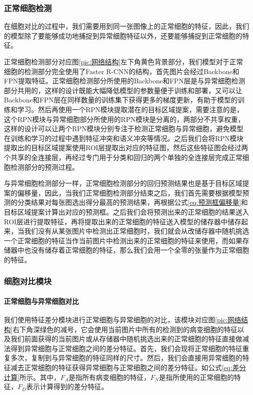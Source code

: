 \subsubsection{正常细胞检测}
\par 在细胞对比的过程中，我们需要用到同一张图像上的正常细胞的特征，因此，我们的模型除了要能够成功地捕捉到异常细胞特征以外，还要能够捕捉到正常细胞的特征。
\par 正常细胞检测部分对应图\ref{pic:网络结构}左下角黄色背景部分，我们模型对于正常细胞的检测部分完全使用了Faster R-CNN的结构，首先图片会经过Backbone和FPN提取特征。正常细胞检测部分所使用的Backbone和FPN层是与异常细胞检测部分共用的，这样的设计既能大幅降低模型的参数量便于训练和部署，又可以让Backbone和FPN层在同样数量的训练集下获得更多的梯度更新，有助于模型的训练和学习。然后再使用一个RPN模块提取潜在的目标区域提案，需要注意的是，这个RPN模块与异常细胞部分所使用的RPN模块是分离的，两部分不共享权重，这样的设计可以让两个RPN模块分别专注于检测正常细胞与异常细胞，避免模型在训练和学习的过程中遇到特征冲突和语义冲突等情况。之后我们会将RPN模块提取出的目标区域提案使用ROI层提取出对应的特征图，然后这些特征图会经过两个共享的全连接层，再经过专门用于分类和回归的两个单独的全连接层完成正常细胞检测部分的预测过程。
\par 与异常细胞检测部分一样，正常细胞检测部分的回归预测结果也是基于目标区域提案的偏移量，因此，当我们正常细胞检测部分结束之后，我们首先需要根据模型预测的分类结果对每张图选出得分最高的预测结果，再根据公式\ref{eq:预测框偏移量}和目标区域提案计算出对应的预测框。之后我们会将预测出来的正常细胞的结果送入ROI层进行提取特征，再将提取出来的正常细胞的特征送入模型的储存器中储存起来，当我们没有从某张图片中检测出正常细胞时，我们就会从改储存器中随机挑选一个正常细胞的特征当作当前图片中检测出来的正常细胞的特征来使用，而如果存储器中也没有储存着正常细胞的特征，那么我们会用一个全零的张量作为正常细胞的特征。

\subsubsection{细胞对比模块}
\paragraph{正常细胞与异常细胞对比}
\label{sec:正常细胞与异常细胞对比}
\par 我们使用特征差分模块进行正常细胞与异常细胞的对比，该模块对应图\ref{pic:网络结构}右下角深绿色的减号，它会使用当前图片中所有的检测到的病变细胞的特征以及我们前面获得的当前图片或从存储器中随机挑选出来的正常细胞的特征直接做减法得到异常细胞与正常细胞之间的差分特征。首先，我们会现将正常细胞的特征重复多次，复制到与异常细胞的特征同样的尺寸。然后，我们会直接用异常细胞的特征减去正常细胞的特征获得异常细胞与正常细胞之间的差分特征。如公式\ref{eq:差分计算}所示。其中，$F_A$是指所有病变细胞的特征，$F_N$是指所使用的正常细胞的特征，$F_D$表示计算得到的差分特征。

